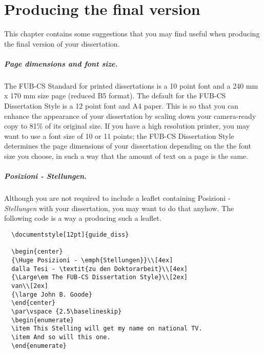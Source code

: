 \chapter{Producing the final version}
This chapter contains some suggestions that you may find useful 
when producing the final version of your dissertation.

\paragraph*{Page dimensions and font size.}
The FUB-CS Standard for printed dissertations is a
10 point font and a 240 mm x 170 mm size page (reduced B5 format).
The default for the FUB-CS Dissertation Style is a 12 point font and A4 paper.
This is so that you can enhance the appearance of your dissertation
by scaling down your camera-ready copy to 81\% of its original size.
If you have a high resolution printer, you may want to use a font size
of 10 or 11 points; 
the FUB-CS Dissertation Style determines the page dimensions of your dissertation 
depending on the the font size you choose, in such a way that the amount of
text on a page is the same.

\paragraph*{Posizioni - \emph{Stellungen}.}
Although you are not required to include a leaflet containing
Posizioni - \emph{Stellungen} with your dissertation, you may want to do that anyhow.
The following code is a way a producing such a leaflet.
\begin{verbatim}
  \documentstyle[12pt]{guide_diss}
  
  \begin{center}
  {\Huge Posizioni - \emph{Stellungen}}\\[4ex]
  dalla Tesi - \textit{zu den Doktorarbeit}\\[4ex]
  {\Large\em The FUB-CS Dissertation Style}\\[2ex]
  van\\[2ex]
  {\large John B. Goode}
  \end{center}
  \par\vspace {2.5\baselineskip}
  \begin{enumerate}
  \item This Stelling will get my name on national TV.
  \item And so will this one.
  \end{enumerate}
\end{verbatim}


